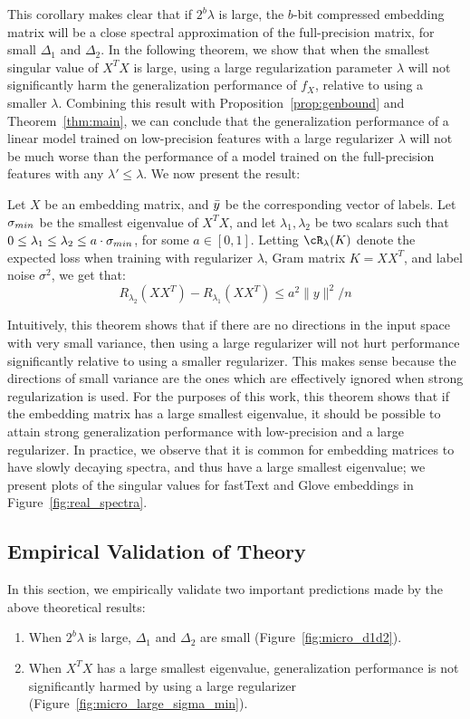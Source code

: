 This corollary makes clear that if $2^b\lambda$ is large, the $b$-bit compressed embedding matrix will be a close spectral approximation of the full-precision matrix, for small $\Delta_1$ and $\Delta_2$.
In the following theorem, we show that when the smallest singular value of $X^TX$ is large, using a large regularization parameter $\lambda$ will not significantly harm the generalization performance of $f_X$, relative to using a smaller $\lambda$.
Combining this result with Proposition~\ref{prop:genbound} and Theorem~\ref{thm:main}, we can conclude that the generalization performance of a linear model trained on low-precision features with a large regularizer $\lambda$ will not be much worse than the performance of a model trained on the full-precision features with any $\lambda' \leq \lambda$.
We now present the result:

\begin{theorem}
	\label{thm:large_lambda}
	Let $X$ be an embedding matrix, and $\by$ be the corresponding vector of labels. Let $\sm$ be the smallest eigenvalue of $X^T X$, and let $\lambda_1, \lambda_2$ be two scalars such that $0 \leq \lambda_1 \leq \lambda_2 \leq a\cdot \sm$, for some $a \in [0,1]$. Letting $\cR_{\lambda}(K)$ denote the expected loss when training with regularizer $\lambda$, Gram matrix $K = XX^T$, and label noise $\sigma^2$, we get that:
	\begin{equation}
	R_{\lambda_2}(XX^T) - R_{\lambda_1}(XX^T) \leq a^2\|y\|^2/n
	\label{eq1}
	\end{equation}
\end{theorem}
Intuitively, this theorem shows that if there are no directions in the input space with very small variance, then using a large regularizer will not hurt performance significantly relative to using a smaller regularizer.
This makes sense because the directions of small variance are the ones which are effectively ignored when strong regularization is used.
For the purposes of this work, this theorem shows that if the embedding matrix has a large smallest eigenvalue, it should be possible to attain strong generalization performance with low-precision and a large regularizer.
In practice, we observe that it is common for embedding matrices to have slowly decaying spectra, and thus have a large smallest eigenvalue;
we present plots of the singular values for fastText and Glove embeddings in Figure~\ref{fig:real_spectra}.

\subsection{Empirical Validation of Theory}
In this section, we empirically validate two important predictions made by the above theoretical results:
\begin{enumerate}
	\item When $2^b \lambda$ is large, $\Delta_1$ and $\Delta_2$ are small (Figure~\ref{fig:micro_d1d2}).
	\item When $X^T X$ has a large smallest eigenvalue, generalization performance is not significantly harmed by using a large regularizer
	(Figure~\ref{fig:micro_large_sigma_min}).
\end{enumerate}

